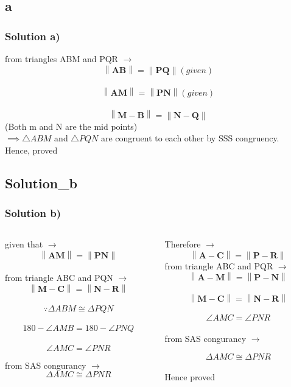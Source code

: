 \documentclass{beamer}
\newcommand\norm[1]{\left\lVert#1\right\rVert}
\renewcommand{\vec}[1]{\mathbf{#1}}
\begin{document}
\subsection{a}
\begin{frame}
\frametitle{Solution a)}
\footnotesize
\label{a}
from triangles ABM and PQR $\to$
\\
$$\norm{\vec{AB}}=\norm{\vec{PQ}}(given)$$
\\
$$\norm{\vec{AM}}=\norm{\vec{PN}}(given)$$
\\
$$\norm{\vec{M}-\vec{B}} = \norm{\vec{N}-\vec{Q}}$$(Both m and N are the mid points)
\newline
\\
$\implies \triangle ABM$ and $\triangle PQN$ are congruent to each other by SSS congruency.
\\
Hence, proved
\end{frame}
\subsection*{\textbf{Solution_b}}
\begin{frame}[fragile]
	\footnotesize
	\frametitle{Solution b)}
	\begin{columns}
		\begin{column}{0.5\textwidth}
			given that $\to$
			\\
			$$\norm{\vec{AM}}=\norm{\vec{PN}}$$ 
			\\
			from triangle ABC and PQN $\to$
			\\
			$$\norm{\vec{M}-\vec{C}} = \norm{\vec{N}-\vec{R}}$$
			\\
			$$\because \Delta ABM \cong \Delta PQN $$
			\\
			$$180 - \angle AMB = 180 -  \angle PNQ$$
			\\
			$$\angle AMC = \angle PNR$$
			
		 from SAS congurancy $ \to$
		 \\
		 $$\Delta AMC \cong \Delta PNR$$
			
		\end{column}
		\begin{column}{0.5\textwidth}
			Therefore $\to$
			\\
			$$ \norm{\vec{A}-\vec{C}} =\norm{\vec{P}-\vec{R}}$$
			from triangle ABC and PQR $\to$
			\\
			$$\norm{\vec{A}-\vec{M}} = \norm{\vec{P}-\vec{N}}$$
			\\
			$$\norm{\vec{M}-\vec{C}} = \norm{\vec{N}-\vec{R}}$$
			\\
			$$\angle AMC = \angle PNR$$
			\\
		 from SAS congurancy $\to$
		 
		 $$ \Delta AMC \cong \Delta PNR$$
		 \\Hence proved	
		\end{column}
	\end{columns}
\end{frame}
\end{document}
